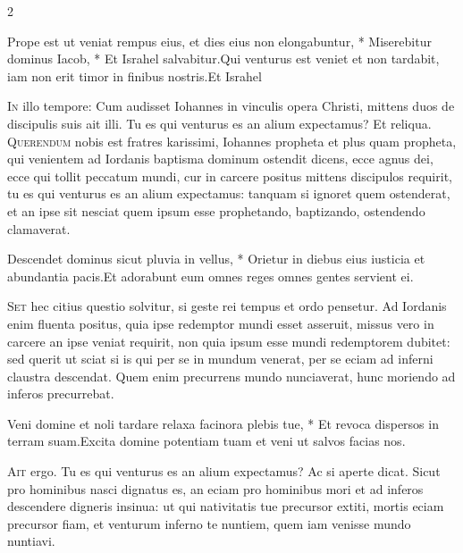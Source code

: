 \begin{multicols*}{2}
\begin{responsory-final}
{Prope est ut veniat rempus eius, et dies eius non elongabuntur, * Miserebitur dominus Iacob, * Et Israhel salvabitur.}{Qui venturus est veniet et non tardabit, iam non erit timor in finibus nostris.}{Et Israhel}
\end{responsory-final}%
\lettrine[lines=2]{\zallmancaps \color{Blue} I}{n} illo tempore: Cum audisset Iohannes in vinculis opera Christi, mittens duos de discipulis suis ait illi. Tu es qui venturus es an alium expectamus? Et reliqua.
 \grecross
\lettrine[lines=2]{\zallmancaps \color{Red} Q}{uerendum} nobis est fratres karissimi, Iohannes propheta et plus quam propheta, qui venientem ad Iordanis baptisma dominum ostendit dicens, ecce agnus dei, ecce qui tollit peccatum mundi, cur in carcere positus mittens discipulos requirit, tu es qui venturus es an alium expectamus: tanquam si ignoret quem ostenderat, et an ipse sit nesciat quem ipsum esse prophetando, baptizando, ostendendo clamaverat.
\begin{responsory}
{Descendet dominus sicut pluvia in vellus, * Orietur in diebus eius iusticia et abundantia pacis.}{Et adorabunt eum omnes reges omnes gentes servient ei.}
\end{responsory}%
\lettrine[lines=2]{\zallmancaps \color{Blue} S}{et} hec citius questio solvitur, si geste rei tempus et ordo pensetur. Ad Iordanis enim fluenta positus, quia ipse redemptor mundi esset asseruit, missus vero in carcere an ipse veniat requirit, non quia ipsum esse mundi redemptorem dubitet: sed querit ut sciat si is qui per se in mundum venerat, per se eciam ad inferni claustra descendat. Quem enim precurrens mundo nunciaverat, hunc moriendo ad inferos precurrebat.
\begin{responsory}
{Veni domine et noli tardare relaxa facinora plebis tue, * Et revoca dispersos in terram suam.}{Excita domine potentiam tuam et veni ut salvos facias nos.}
\end{responsory}%
\lettrine[lines=2]{\zallmancaps \color{Red} A}{it} ergo. Tu es qui venturus es an alium expectamus? Ac si aperte dicat. Sicut pro hominibus nasci dignatus es, an eciam pro hominibus mori et ad inferos descendere digneris insinua: ut qui nativitatis tue precursor extiti, mortis eciam precursor fiam, et venturum inferno te nuntiem, quem iam venisse mundo nuntiavi.

\end{multicols*}
